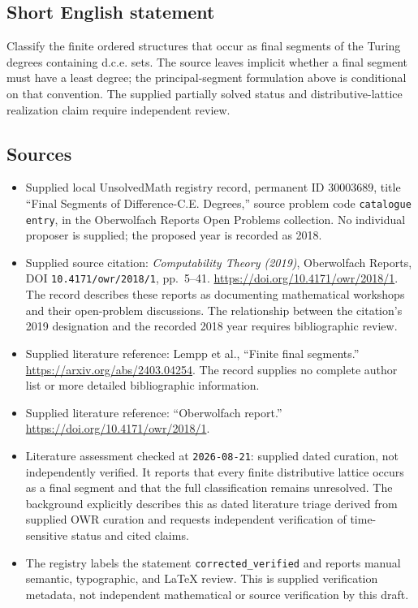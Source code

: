 \documentclass[11pt]{article}
\begin{document}
\subsection{Short English statement}
Classify the finite ordered structures that occur as final segments of the Turing degrees containing d.c.e. sets. The source leaves implicit whether a final segment must have a least degree; the principal-segment formulation above is conditional on that convention. The supplied partially solved status and distributive-lattice realization claim require independent review.
\subsection{Sources}
\begin{itemize}
\item Supplied local UnsolvedMath registry record, permanent ID \(30003689\), title ``Final Segments of Difference-C.E. Degrees,'' source problem code \texttt{catalogue entry}, in the Oberwolfach Reports Open Problems collection. No individual proposer is supplied; the proposed year is recorded as 2018.
\item Supplied source citation: \emph{Computability Theory (2019)}, Oberwolfach Reports, DOI \texttt{10.4171/owr/2018/1}, pp.\ 5--41. \url{https://doi.org/10.4171/owr/2018/1}. The record describes these reports as documenting mathematical workshops and their open-problem discussions. The relationship between the citation's 2019 designation and the recorded 2018 year requires bibliographic review.
\item Supplied literature reference: Lempp et al., ``Finite final segments.'' \url{https://arxiv.org/abs/2403.04254}. The record supplies no complete author list or more detailed bibliographic information.
\item Supplied literature reference: ``Oberwolfach report.'' \url{https://doi.org/10.4171/owr/2018/1}.
\item Literature assessment checked at \texttt{2026-08-21}: supplied dated curation, not independently verified. It reports that every finite distributive lattice occurs as a final segment and that the full classification remains unresolved. The background explicitly describes this as dated literature triage derived from supplied OWR curation and requests independent verification of time-sensitive status and cited claims.
\item The registry labels the statement \texttt{corrected\_verified} and reports manual semantic, typographic, and LaTeX review. This is supplied verification metadata, not independent mathematical or source verification by this draft.
\end{itemize}
\end{document}
